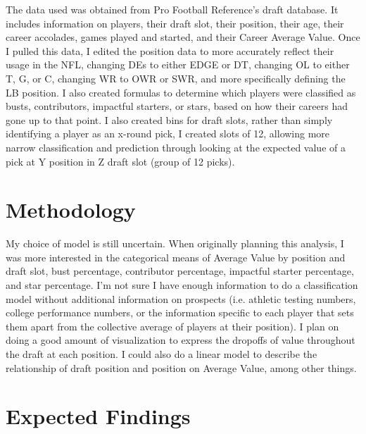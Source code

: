 \documentclass{article}
\begin{document}
The data used was obtained from Pro Football Reference's draft database. It includes information on players, their draft slot, their position, their age, their career accolades, games played and started, and their Career Average Value. Once I pulled this data, I edited the position data to more accurately reflect their usage in the NFL, changing DEs to either EDGE or DT, changing OL to either T, G, or C, changing WR to OWR or SWR, and more specifically defining the LB position. I also created formulas to determine which players were classified as busts, contributors, impactful starters, or stars, based on how their careers had gone up to that point. I also created bins for draft slots, rather than simply identifying a player as an x-round pick, I created slots of 12, allowing more narrow classification and prediction through looking at the expected value of a pick at Y position in Z draft slot (group of 12 picks).

\section{Methodology}
My choice of model is still uncertain. When originally planning this analysis, I was more interested in the categorical means of Average Value by position and draft slot, bust percentage, contributor percentage, impactful starter percentage, and star percentage. I'm not sure I have enough information to do a classification model without additional information on prospects (i.e. athletic testing numbers, college performance numbers, or the information specific to each player that sets them apart from the collective average of players at their position). I plan on doing a good amount of visualization to express the dropoffs of value throughout the draft at each position. I could also do a linear model to describe the relationship of draft position and position on Average Value, among other things. 

\section{Expected Findings}
\end{document}

